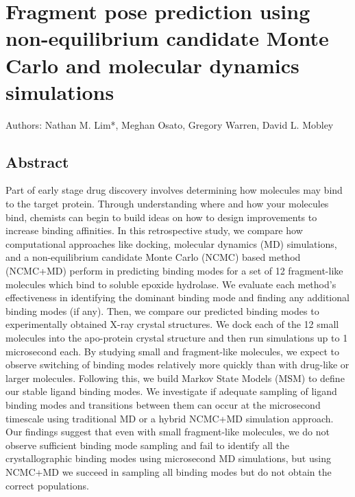 \chapter{Fragment pose prediction using non-equilibrium candidate Monte Carlo and molecular dynamics simulations} \label{SEH-BLUES}

\small{Authors: Nathan M. Lim*, Meghan Osato, Gregory Warren, David L. Mobley}\\

\section{Abstract}
Part of early stage drug discovery involves determining how molecules may bind to the target protein.
Through understanding where and how your molecules bind, chemists can begin to build ideas on how to design improvements to increase binding affinities.
In this retrospective study, we compare how computational approaches like docking, molecular dynamics (MD) simulations, and a non-equilibrium candidate Monte Carlo (NCMC) based method (NCMC+MD) perform in predicting binding modes for a set of 12 fragment-like molecules which bind to soluble epoxide hydrolase.
We evaluate each method's effectiveness in identifying the dominant binding mode and finding any additional binding modes (if any).
Then, we compare our predicted binding modes to experimentally obtained X-ray crystal structures.
We dock each of the 12 small molecules into the apo-protein crystal structure and then run simulations up to 1 microsecond each.
By studying small and fragment-like molecules, we expect to observe switching of binding modes relatively more quickly than with drug-like or larger molecules.
Following this, we build Markov State Models (MSM) to define our stable ligand binding modes.
We investigate if adequate sampling of ligand binding modes and transitions between them can occur at the microsecond timescale using traditional MD or a hybrid NCMC+MD simulation approach.
Our findings suggest that even with small fragment-like molecules, we do not observe sufficient binding mode sampling and fail to identify all the crystallographic binding modes using microsecond MD simulations, but using NCMC+MD we succeed in sampling all binding modes but do not obtain the correct populations.


